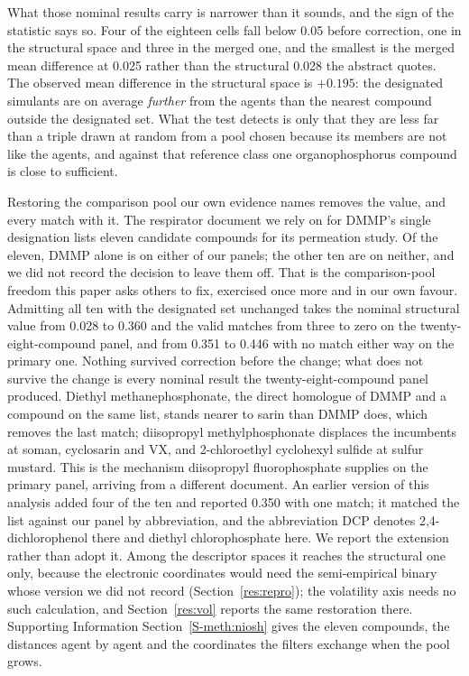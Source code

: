 \documentclass[journal=ancham,manuscript=article,margin=1in]{achemso}
\begin{document}
What those nominal results carry is narrower than it sounds, and the sign of
the statistic says so. Four of the eighteen cells fall below 0.05 before
correction, one in the structural space and three in the merged one, and the
smallest is the merged mean difference at 0.025 rather than the structural
0.028 the abstract quotes. The observed mean difference in the structural space
is $+0.195$: the designated simulants are on average
\emph{further} from the agents than the nearest compound outside the designated
set. What the test detects is only that they are less far than a triple drawn at
random from a pool chosen because its members are not like the agents, and
against that reference class one organophosphorus compound is close to
sufficient.

Restoring the comparison pool our own evidence names removes the value, and
every match with it. The respirator document we rely on for DMMP's single
designation lists eleven candidate compounds for its permeation study. Of the
eleven, DMMP alone is on either of our panels; the other ten are on neither, and
we did not record the decision to leave them off. That is the comparison-pool
freedom this paper asks others to fix, exercised once more and in our own
favour. Admitting all ten with the designated set unchanged takes the nominal
structural value from 0.028 to 0.360 and the valid matches from three to zero on
the twenty-eight-compound panel, and from 0.351 to 0.446 with no match either
way on the primary one. Nothing survived correction before the change; what does
not survive the change is every nominal result the twenty-eight-compound panel
produced. Diethyl methanephosphonate, the direct homologue of DMMP and a
compound on the same list, stands nearer to sarin than DMMP does, which removes
the last match; diisopropyl methylphosphonate displaces the incumbents at soman,
cyclosarin and VX, and 2-chloroethyl cyclohexyl sulfide at sulfur mustard. This
is the mechanism diisopropyl fluorophosphate supplies on the primary panel,
arriving from a different document. An earlier version of this analysis added
four of the ten and reported 0.350 with one match; it matched the list against
our panel by abbreviation, and the abbreviation DCP denotes
2,4-dichlorophenol there and diethyl chlorophosphate here. We report the
extension rather than adopt it. Among the descriptor spaces it reaches the
structural one only, because the electronic coordinates would need the
semi-empirical binary whose version we did not record
(Section~\ref{res:repro}); the volatility axis needs no such calculation, and
Section~\ref{res:vol} reports the same restoration there. Supporting Information
Section~\ref{S-meth:niosh} gives the eleven compounds, the distances agent by
agent and the coordinates the filters exchange when the pool grows.
\end{document}
